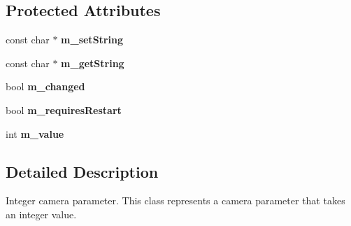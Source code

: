 \subsection*{Protected Attributes}
\begin{DoxyCompactItemize}
\item 
\hypertarget{classIntCameraParameter_aef59bab75d17772001e7d37077f74692}{
const char $\ast$ {\bfseries m\_\-setString}}
\label{classIntCameraParameter_aef59bab75d17772001e7d37077f74692}

\item 
\hypertarget{classIntCameraParameter_aba04374f4f6c16e906434f7156c35a30}{
const char $\ast$ {\bfseries m\_\-getString}}
\label{classIntCameraParameter_aba04374f4f6c16e906434f7156c35a30}

\item 
\hypertarget{classIntCameraParameter_a09476ec7be001a682f65bb15c6288a35}{
bool {\bfseries m\_\-changed}}
\label{classIntCameraParameter_a09476ec7be001a682f65bb15c6288a35}

\item 
\hypertarget{classIntCameraParameter_add027a6f99ab10d8e4ace36fc1ea4114}{
bool {\bfseries m\_\-requiresRestart}}
\label{classIntCameraParameter_add027a6f99ab10d8e4ace36fc1ea4114}

\item 
\hypertarget{classIntCameraParameter_afa07051193466a67f72b8dcb7ec26c24}{
int {\bfseries m\_\-value}}
\label{classIntCameraParameter_afa07051193466a67f72b8dcb7ec26c24}

\end{DoxyCompactItemize}


\subsection{Detailed Description}
Integer camera parameter. This class represents a camera parameter that takes an integer value. 


